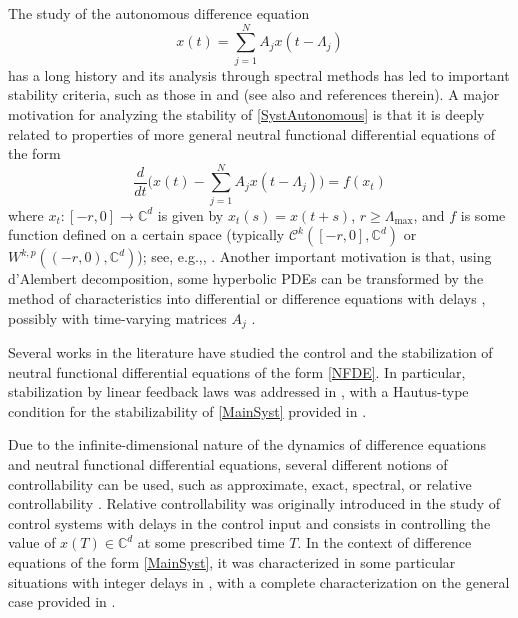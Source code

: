 \documentclass[JEP,XML,SOM,Unicode]{cedram}
\renewcommand{\eg}{e.g.,\xspace}
\theoremstyle{plain}
\theoremstyle{definition}
\begin{document}
The study of the autonomous difference equation\vspace*{-3pt}
\begin{equation}
\label{SystAutonomous}
x(t) = \sum_{j=1}^N A_j x(t - \Lambda_j)
\end{equation}
has a long history and its analysis through spectral methods has led to important stability criteria, such as those in \cite{Avellar1980Zeros} and \cite[Chap.\,9]{Hale1993Introduction} (see also \cite{Melvin1974Stability, Cruz1970Stability, Henry1974Linear, Datko1977Linear, Hale1985Stability, Michiels2009Strong} and references therein). A major motivation for analyzing the stability of \eqref{SystAutonomous} is that it is deeply related to properties of more general neutral functional differential equations of the form\vspace*{-3pt}
\begin{equation}
\label{NFDE}
\frac{d}{dt}\biggl(x(t) - \sum_{j=1}^N A_j x(t - \Lambda_j)\biggr) = f(x_t)
\end{equation}
where $x_t: [-r, 0] \to \mathbb C^d$ is given by $x_t(s) = x(t + s)$, $r \geq \Lambda_{\max}$, and $f$ is some function defined on a certain space (typically $\mathcal C^k([-r, 0], \mathbb C^d)$ or $W^{k, p}((-r, 0), \mathbb C^d)$); see, \eg \cite{Cruz1970Stability, Datko1977Linear, Hale1985Stability, Ngoc2015Exponential}, \cite[\S 9.7]{Hale1993Introduction}. Another important motivation is that, using d'Alembert decomposition, some hyperbolic PDEs can be transformed by the method of characteristics into differential or difference equations with delays \cite{Coron2015Dissipative, Coron2008Dissipative, Cooke1968Differential, Fridman2010Bounds, Slemrod1971Nonexistence, Kloss2012Flow}, possibly with time-varying matrices $A_j$ \cite{Chitour2017Persistently, Chitour2016Stability}.

Several works in the literature have studied the control and the stabilization of neutral functional differential equations of the form \eqref{NFDE}. In particular, stabilization by linear feedback laws was addressed in \cite{Pandolfi1976Stabilization, Hale2002Strong, OConnor1983Stabilization}, with a Hautus-type condition for the stabilizability of \eqref{MainSyst} provided in \cite{Hale2002Strong}.

Due to the infinite-dimensional nature of the dynamics of difference equations and neutral functional differential equations, several different notions of controllability can be used, such as approximate, exact, spectral, or relative controllability \cite{Salamon1984Control, Chyung1970Controllability, Diblik2008Controllability, Pospisil2015Relative, Mazanti2017Relative}. Relative controllability was originally introduced in the study of control systems with delays in the control input \cite{Chyung1970Controllability} and consists in controlling the value of $x(T) \in \mathbb C^d$ at some prescribed time $T$. In the context of difference equations of the form \eqref{MainSyst}, it was characterized in some particular situations with integer delays in \cite{Diblik2008Controllability, Pospisil2015Relative}, with a complete characterization on the general case provided in \cite{Mazanti2017Relative}.
\end{document}
